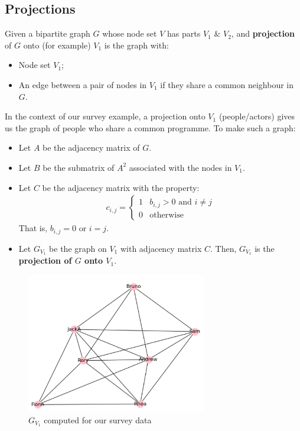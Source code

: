 \documentclass[a4paper,11pt]{article}
\begin{document}
\subsection{Projections}
Given a bipartite graph $G$ whose node set $V$ has parts $V_1$ \& $V_2$, and \textbf{projection} of $G$ onto (for example) $V_1$ is the graph with:
\begin{itemize}
    \item   Node set $V_1$;
    \item   An edge between a pair of nodes in $V_1$ if they share a common neighbour in $G$.
\end{itemize}

In the context of our survey example, a projection onto $V_1$ (people/actors) gives us the graph of people who share a common programme.
To make such a graph:
\begin{itemize}
    \item   Let $A$ be the adjacency matrix of $G$.
    \item   Let $B$ be the submatrix of $A^2$ associated with the nodes in $V_1$.
    \item   Let $C$ be the adjacency matrix with the property:
            \begin{align*}
                c_{i,j} =
                \begin{cases}
                    1 & b_{i,j} > 0 \text{ and } i \neq j \\
                    0 & \text{otherwise}
                \end{cases}
            \end{align*}
            That is, $b_{i,j} = 0 $ or $i=j$.
    \item   Let $G_{V_1}$ be the graph on $V_1$ with adjacency matrix $C$.
            Then, $G_{V_1}$ is the \textbf{projection of $G$ onto $V_1$}.
\end{itemize}

\begin{figure}[H]
    \centering
    \includegraphics[width=0.7\textwidth]{./images/surveygv1.png}
    \caption{ $G_{V_1}$ computed for our survey data }
\end{figure}
\end{document}
